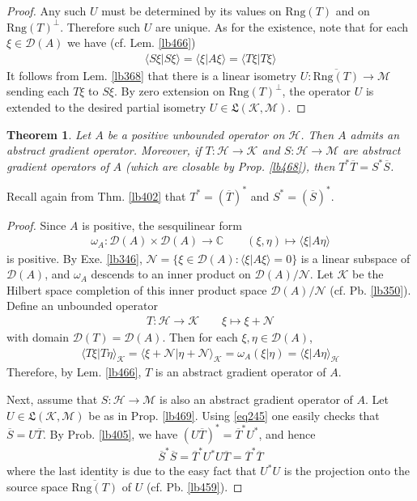 \documentclass[12pt,b5paper,notitlepage]{article}
\theoremstyle{definition}
\theoremstyle{plain}
\newtheorem{thm}[df]{Theorem}
\newcommand{\fk}{\mathfrak}
\newcommand{\ovl}{\overline}
\newcommand{\Dom}{\mathscr{D}}
\newcommand{\bk}[1]{\langle {#1}\rangle}
\newcommand{\scr}{\mathscr}
\newcommand{\Cbb}{\mathbb C}
\newcommand{\Rng}{\mathrm{Rng}}
\newcommand{\MH}{\mathcal H}
\newcommand{\MK}{\mathcal K}
\newcommand{\MM}{\mathcal M}
\numberwithin{equation}{section}
\begin{document}
\begin{proof}
Any such $U$ must be determined by its values on $\Rng(T)$ and on $\Rng(T)^\perp$. Therefore such $U$ are unique. As for the existence, note that for each $\xi\in\Dom(A)$ we have (cf. Lem. \ref{lb466})
\begin{align*}
\bk{S\xi|S\xi}=\bk{\xi|A\xi}=\bk{T\xi|T\xi}
\end{align*}
It follows from Lem. \ref{lb368} that there is a linear isometry $U:\ovl{\Rng(T)}\rightarrow\MM$ sending each $T\xi$ to $S\xi$. By zero extension on $\Rng(T)^\perp$, the operator $U$ is extended to the desired partial isometry $U\in\fk L(\MK,\MM)$.
\end{proof}


\begin{thm}\label{lb470}
Let $A$ be a positive unbounded operator on $\MH$. Then $A$ admits an abstract gradient operator. Moreover, if $T:\MH\rightarrow\MK$ and $S:\MH\rightarrow\MM$ are abstract gradient operators of $A$ (which are closable by Prop. \ref{lb468}), then $T^*\ovl T=S^*\ovl S$.
\end{thm}


Recall again from Thm. \ref{lb402} that $T^*=(\ovl T)^*$ and $S^*=(\ovl S)^*$.


\begin{proof}
Since $A$ is positive, the sesquilinear form
\begin{align*}
\omega_A:\Dom(A)\times\Dom(A)\rightarrow\Cbb\qquad (\xi,\eta)\mapsto \bk{\xi|A\eta}
\end{align*}
is positive. By Exe. \ref{lb346}, $\scr N=\{\xi\in\Dom(A):\bk{\xi|A\xi}=0\}$ is a linear subspace of $\Dom(A)$, and $\omega_A$ descends to an inner product on $\Dom(A)/\scr N$. Let $\MK$ be the Hilbert space completion of this inner product space $\Dom(A)/\scr N$ (cf. Pb. \ref{lb350}). Define an unbounded operator
\begin{align*}
T:\MH\rightarrow\MK\qquad \xi\mapsto \xi+\scr N
\end{align*}
with domain $\Dom(T)=\Dom(A)$. Then for each $\xi,\eta\in\Dom(A)$,
\begin{align*}
\bk{T\xi|T\eta}_{\MK}=\bk{\xi+\scr N|\eta+\scr N}_{\MK}=\omega_A(\xi|\eta)=\bk{\xi|A\eta}_{\MH}
\end{align*}
Therefore, by Lem. \ref{lb466}, $T$ is an abstract gradient operator of $A$.

Next, assume that $S:\MH\rightarrow\MM$ is also an abstract gradient operator of $A$. Let $U\in\fk L(\MK,\MM)$ be as in Prop. \ref{lb469}. Using \eqref{eq245} one easily checks that $\ovl S=U\ovl T$. By Prob. \ref{lb405}, we have $(U\ovl T)^*=\ovl T^*U^*$, and hence
\begin{align*}
\ovl S^*\ovl S=\ovl T^*U^*U\ovl T=\ovl T^*\ovl T
\end{align*}
where the last identity is due to the easy fact that $U^*U$ is the projection onto the source space $\ovl{\Rng(T)}$ of $U$ (cf. Pb. \ref{lb459}).
\end{proof}
\end{document}
